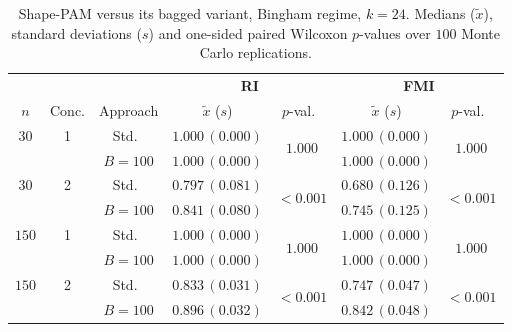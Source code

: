 \begin{table}[h]
\centering
\caption{Shape-PAM versus its bagged variant, Bingham regime, $k=24$. Medians ($\tilde x$), standard deviations ($s$) and one-sided paired Wilcoxon $p$-values over $100$ Monte Carlo replications.}
\label{tab:pam-bing-k24}
\footnotesize
\begin{tabular}{cc c cc cc}
\toprule
& & & \multicolumn{2}{c}{\textbf{RI}} & \multicolumn{2}{c}{\textbf{FMI}} \\
\cmidrule(lr){4-5}\cmidrule(lr){6-7}
$n$ & Conc. & Approach & $\tilde x$ ($s$) & $p$-val.\ & $\tilde x$ ($s$) & $p$-val.\ \\
\midrule
$30$ & 1 & Std.\ & $1.000\,(0.000)$ & \multirow{2}{*}{$1.000$} & $1.000\,(0.000)$ & \multirow{2}{*}{$1.000$} \\
     &   & $B{=}100$ & $1.000\,(0.000)$ & & $1.000\,(0.000)$ & \\
$30$ & 2 & Std.\ & $0.797\,(0.081)$ & \multirow{2}{*}{$\mathbf{<\!0.001}$} & $0.680\,(0.126)$ & \multirow{2}{*}{$\mathbf{<\!0.001}$} \\
     &   & $B{=}100$ & $0.841\,(0.080)$ & & $0.745\,(0.125)$ & \\
$150$ & 1 & Std.\ & $1.000\,(0.000)$ & \multirow{2}{*}{$1.000$} & $1.000\,(0.000)$ & \multirow{2}{*}{$1.000$} \\
     &   & $B{=}100$ & $1.000\,(0.000)$ & & $1.000\,(0.000)$ & \\
$150$ & 2 & Std.\ & $0.833\,(0.031)$ & \multirow{2}{*}{$\mathbf{<\!0.001}$} & $0.747\,(0.047)$ & \multirow{2}{*}{$\mathbf{<\!0.001}$} \\
     &   & $B{=}100$ & $0.896\,(0.032)$ & & $0.842\,(0.048)$ & \\
\bottomrule
\end{tabular}
\end{table}

